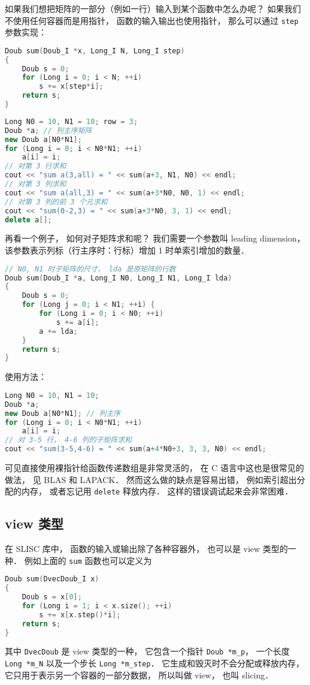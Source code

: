 
\begin{issues}
\issueDraft
\end{issues}


如果我们想把矩阵的一部分（例如一行）输入到某个函数中怎么办呢？ 如果我们不使用任何容器而是用指针， 函数的输入输出也使用指针， 那么可以通过 \verb|step| 参数实现：
\begin{lstlisting}[language=cpp]
Doub sum(Doub_I *x, Long_I N, Long_I step)
{
    Doub s = 0;
    for (Long i = 0; i < N; ++i)
        s += x[step*i];
    return s;
}
\end{lstlisting}

\begin{lstlisting}[language=cpp]
Long N0 = 10, N1 = 10; row = 3;
Doub *a; // 列主序矩阵
new Doub a[N0*N1];
for (Long i = 0; i < N0*N1; ++i)
    a[i] = i;
// 对第 3 行求和
cout << "sum a(3,all) = " << sum(a+3, N1, N0) << endl;
// 对第 3 列求和
cout << "sum a(all,3) = " << sum(a+3*N0, N0, 1) << endl;
// 对第 3 列的前 3 个元求和
cout << "sum(0-2,3) = " << sum(a+3*N0, 3, 1) << endl;
delete a[];
\end{lstlisting}
再看一个例子， 如何对子矩阵求和呢？ 我们需要一个参数叫 leading dimension， 该参数表示列标（行主序时：行标）增加 1 时单索引增加的数量．
\begin{lstlisting}[language=cpp]
// N0, N1 时子矩阵的尺寸， lda 是原矩阵的行数
Doub sum(Doub_I *a, Long_I N0, Long_I N1, Long_I lda)
{
    Doub s = 0;
    for (Long j = 0; i < N1; ++i) {
        for (Long i = 0; i < N0; ++i)
            s += a[i];
        a += lda;
    }
    return s;
}
\end{lstlisting}
使用方法：
\begin{lstlisting}[language=cpp]
Long N0 = 10, N1 = 10;
Doub *a;
new Doub a[N0*N1]; // 列主序
for (Long i = 0; i < N0*N1; ++i)
    a[i] = i;
// 对 3-5 行， 4-6 列的子矩阵求和
cout << "sum(3-5,4-6) = " << sum(a+4*N0+3, 3, 3, N0) << endl;
\end{lstlisting}
可见直接使用裸指针给函数传递数组是非常灵活的， 在 C 语言中这也是很常见的做法， 见 BLAS 和 LAPACK． 然而这么做的缺点是容易出错， 例如索引超出分配的内存， 或者忘记用 \verb|delete| 释放内存． 这样的错误调试起来会非常困难．

\subsection{view 类型}
在 SLISC 库中， 函数的输入或输出除了各种容器外， 也可以是 view 类型的一种． 例如上面的 \verb|sum| 函数也可以定义为
\begin{lstlisting}[language=cpp]
Doub sum(DvecDoub_I x)
{
    Doub s = x[0];
    for (Long i = 1; i < x.size(); ++i)
        s += x[x.step()*i];
    return s;
}
\end{lstlisting}
其中 \verb|DvecDoub| 是 view 类型的一种， 它包含一个指针 \verb|Doub *m_p|， 一个长度 \verb|Long *m_N| 以及一个步长 \verb|Long *m_step|． 它生成和毁灭时不会分配或释放内存， 它只用于表示另一个容器的一部分数据， 所以叫做 view， 也叫 slicing．

